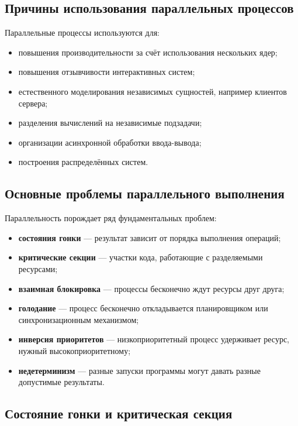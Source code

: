 \documentclass[12pt,a4paper]{article}
\begin{document}
\subsection{Причины использования параллельных процессов}

Параллельные процессы используются для:
\begin{itemize}
    \item повышения производительности за счёт использования нескольких ядер;
    \item повышения отзывчивости интерактивных систем;
    \item естественного моделирования независимых сущностей, например клиентов сервера;
    \item разделения вычислений на независимые подзадачи;
    \item организации асинхронной обработки ввода-вывода;
    \item построения распределённых систем.
\end{itemize}

\subsection{Основные проблемы параллельного выполнения}

Параллельность порождает ряд фундаментальных проблем:
\begin{itemize}
    \item \textbf{состояния гонки} --- результат зависит от порядка выполнения операций;
    \item \textbf{критические секции} --- участки кода, работающие с разделяемыми ресурсами;
    \item \textbf{взаимная блокировка} --- процессы бесконечно ждут ресурсы друг друга;
    \item \textbf{голодание} --- процесс бесконечно откладывается планировщиком или синхронизационным механизмом;
    \item \textbf{инверсия приоритетов} --- низкоприоритетный процесс удерживает ресурс, нужный высокоприоритетному;
    \item \textbf{недетерминизм} --- разные запуски программы могут давать разные допустимые результаты.
\end{itemize}

\subsection{Состояние гонки и критическая секция}
\end{document}
